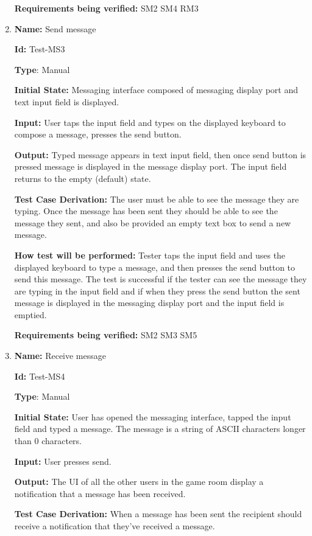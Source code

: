 \documentclass[12pt, titlepage]{article}
\begin{document}
\begin{enumerate}
\textbf{Requirements being verified: } SM2 SM4 RM3

\item{\textbf{Name:} Send message} \label{itm:Test-MS3}

\textbf{Id:} Test-MS3

\textbf{Type}: Manual

\textbf{Initial State:} Messaging interface composed of messaging display port and text input field is displayed.

\textbf{Input:} User taps the input field and types on the displayed keyboard to compose a message, presses the send button.

\textbf{Output:} Typed message appears in text input field, then once send button is pressed message is displayed in the message display port. The input field returns to the empty (default) state.

\textbf{Test Case Derivation:}
The user must be able to see the message they are typing. Once the message has been sent they should be able to see the message they sent, and also be provided an empty text box to send a new message.

\textbf{How test will be performed:}
Tester taps the input field and uses the displayed keyboard to type a message, and then presses the send button to send this message. The test is successful if the tester can see the message they are typing in the input field and if when they press the send button the sent message is displayed in the messaging display port and the input field is emptied.

\textbf{Requirements being verified: } SM2 SM3 SM5

\item{\textbf{Name:} Receive message} \label{itm:Test-MS4}

\textbf{Id:} Test-MS4

\textbf{Type}: Manual

\textbf{Initial State:} User has opened the messaging interface, tapped the input field and typed a message. The message is a string of ASCII characters longer than 0 characters.

\textbf{Input:} User presses send.

\textbf{Output:} The UI of all the other users in the game room display a notification that a message has been received.

\textbf{Test Case Derivation:}
When a message has been sent the recipient should receive a notification that they've received a message.


\end{enumerate}
\end{document}

